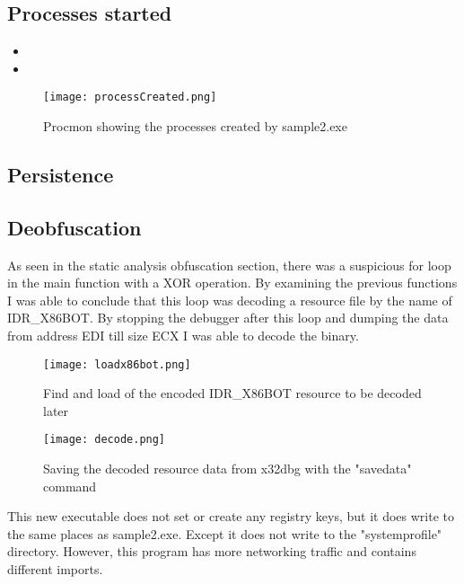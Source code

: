 \documentclass{article}
\begin{document}
    \subsection{Processes started}
    \begin{itemize}
        \item {}
        \item {}
    \end{itemize}
    \begin{figure}[H]
        \texttt{[image: processCreated.png]}
        \caption{Procmon showing the processes created by sample2.exe}
    \end{figure}

    \subsection{Persistence}
    \subsection{Deobfuscation}
    As seen in the static analysis obfuscation section, there was a suspicious for loop in the main function with a XOR operation. By examining the previous functions I was able to conclude that this loop was decoding a resource file by the name of IDR{\_}X86BOT. By stopping the debugger after this loop and dumping the data from address EDI till size ECX I was able to decode the binary. 
    \begin{figure}[H]
        \texttt{[image: loadx86bot.png]}
        \caption{Find and load of the encoded IDR{\_}X86BOT resource to be decoded later}
    \end{figure}
    \begin{figure}[H]
        \texttt{[image: decode.png]}
        \caption{Saving the decoded resource data from x32dbg with the "savedata" command}
    \end{figure}
    
    This new executable does not set or create any registry keys, but it does write to the same places as sample2.exe. Except it does not write to the "systemprofile" directory. However, this program has more networking traffic and contains different imports.
    \pagebreak
    \printbibliography
\end{document}
